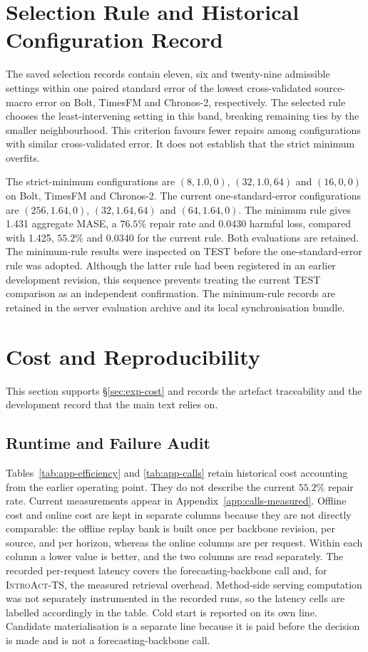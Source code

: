 \documentclass{article}
\newcommand{\introact}{\textsc{IntroAct-TS}}
\begin{document}
\section{Selection Rule and Historical Configuration Record}
\label{app:selection-rule}

The saved selection records contain eleven, six and twenty-nine admissible settings within
one paired standard error of the lowest cross-validated source-macro error on Bolt, TimesFM
and Chronos-2, respectively. The selected rule chooses the least-intervening setting in this
band, breaking remaining ties by the smaller neighbourhood. This criterion favours fewer
repairs among configurations with similar cross-validated error. It does not establish that
the strict minimum overfits.

The strict-minimum configurations are $(8,1.0,0)$, $(32,1.0,64)$ and $(16,0,0)$ on Bolt,
TimesFM and Chronos-2. The current one-standard-error configurations are $(256,1.64,0)$,
$(32,1.64,64)$ and $(64,1.64,0)$. The minimum rule gives 1.431 aggregate MASE, a $76.5\%$
repair rate and 0.0430 harmful loss, compared with 1.425, $55.2\%$ and 0.0340 for the
current rule. Both evaluations are retained. The minimum-rule results were inspected on
TEST before the one-standard-error rule was adopted. Although the latter rule had been
registered in an earlier development revision, this sequence prevents treating the current
TEST comparison as an independent confirmation. The minimum-rule records are retained in
the server evaluation archive and its local synchronisation bundle.

\section{Cost and Reproducibility}

This section supports \S\ref{sec:exp-cost} and records the artefact traceability and the
development record that the main text relies on.

\subsection{Runtime and Failure Audit}
\label{app:calls}
Tables~\ref{tab:app-efficiency} and \ref{tab:app-calls} retain historical cost accounting
from the earlier operating point. They do not describe the current $55.2\%$ repair rate.
Current measurements appear in Appendix~\ref{app:calls-measured}. Offline cost and online cost are kept in separate columns because
they are not directly comparable: the offline replay bank is built once per backbone revision,
per source, and per horizon, whereas the online columns are per request. Within each column a
lower value is better, and the two columns are read separately. The recorded per-request
latency covers the forecasting-backbone call and, for \introact{}, the measured retrieval
overhead. Method-side serving computation was not separately instrumented in the recorded
runs, so the latency cells are labelled accordingly in the table. Cold start is
reported on its own line. Candidate materialisation is a separate line because it is paid
before the decision is made and is not a forecasting-backbone call.
\end{document}
